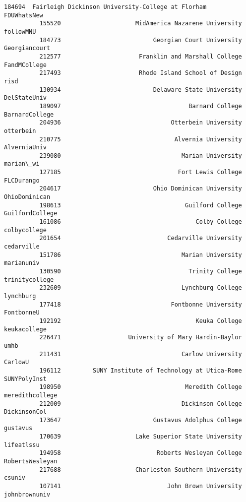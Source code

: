 \documentclass[11pt]{article}
\begin{document}
\begin{Verbatim}[commandchars=\\\{\}]
          184694  Fairleigh Dickinson University-College at Florham      FDUWhatsNew   
          155520                     MidAmerica Nazarene University        followMNU   
          184773                          Georgian Court University    Georgiancourt   
          212577                      Franklin and Marshall College     FandMCollege   
          217493                      Rhode Island School of Design             risd   
          130934                          Delaware State University     DelStateUniv   
          189097                                    Barnard College   BarnardCollege   
          204936                               Otterbein University        otterbein   
          210775                                Alvernia University     AlverniaUniv   
          239080                                  Marian University        marian\_wi   
          127185                                 Fort Lewis College       FLCDurango   
          204617                          Ohio Dominican University    OhioDominican   
          198613                                   Guilford College  GuilfordCollege   
          161086                                      Colby College     colbycollege   
          201654                              Cedarville University       cedarville   
          151786                                  Marian University       marianuniv   
          130590                                    Trinity College   trinitycollege   
          232609                                  Lynchburg College        lynchburg   
          177418                               Fontbonne University       FontbonneU   
          192192                                      Keuka College     keukacollege   
          226471                   University of Mary Hardin-Baylor             umhb   
          211431                                  Carlow University          CarlowU   
          196112         SUNY Institute of Technology at Utica-Rome     SUNYPolyInst   
          198950                                   Meredith College  meredithcollege   
          212009                                  Dickinson College     DickinsonCol   
          173647                          Gustavus Adolphus College         gustavus   
          170639                     Lake Superior State University       lifeatlssu   
          194958                           Roberts Wesleyan College  RobertsWesleyan   
          217688                     Charleston Southern University           csuniv   
          107141                              John Brown University    johnbrownuniv   

\end{Verbatim}
\end{document}
